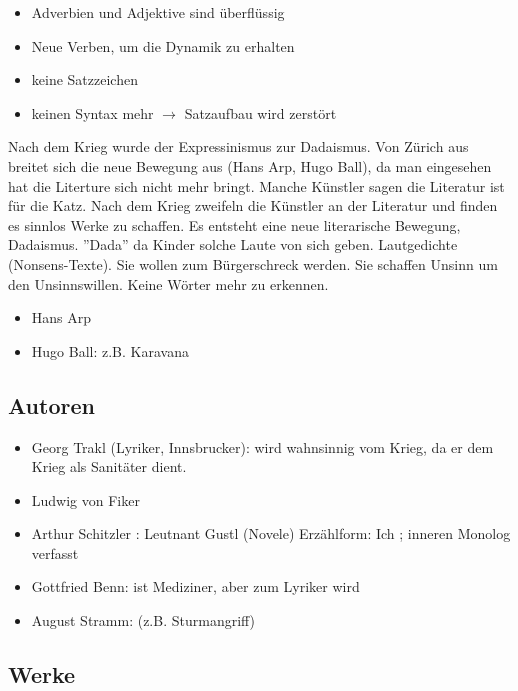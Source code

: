 \documentclass[12pt,a4paper]{article}
\begin{document}
\begin{itemize}

\item Adverbien und Adjektive sind überflüssig
\item Neue Verben, um die Dynamik zu erhalten
\item keine Satzzeichen
\item keinen Syntax mehr $\rightarrow$ Satzaufbau wird zerstört

\end{itemize}

Nach dem Krieg wurde der Expressinismus zur Dadaismus. Von Zürich aus breitet sich die neue Bewegung aus (Hans Arp, Hugo Ball), da man eingesehen hat die Literture sich nicht mehr bringt. Manche Künstler sagen die Literatur ist für die Katz.
\newline
\newline
Nach dem Krieg zweifeln die Künstler an der Literatur und finden es sinnlos Werke zu schaffen. Es entsteht eine neue literarische Bewegung, Dadaismus. ''Dada'' da Kinder solche Laute von sich geben. Lautgedichte (Nonsens-Texte). Sie wollen zum Bürgerschreck werden. Sie schaffen Unsinn um den Unsinnswillen. Keine Wörter mehr zu erkennen. 

\begin{itemize}
\item Hans Arp
\item Hugo Ball: z.B. Karavana
\end{itemize}

\subsection{Autoren}

\begin{itemize}
\item Georg Trakl (Lyriker, Innsbrucker): wird wahnsinnig vom Krieg, da er dem Krieg als Sanitäter dient.
\item Ludwig von Fiker
\item Arthur Schitzler : Leutnant Gustl (Novele) Erzählform: Ich ; inneren Monolog verfasst
\item Gottfried Benn: ist Mediziner, aber zum Lyriker wird
\item August Stramm: (z.B. Sturmangriff) 
\end{itemize}

\subsection{Werke}
\end{document}
